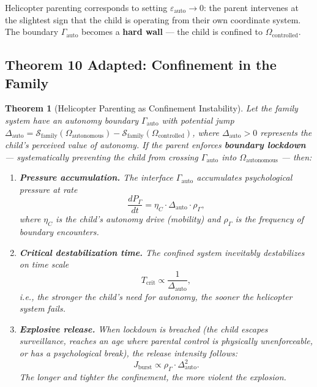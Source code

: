 \documentclass[11pt,a4paper]{article}
\newtheorem{theorem}{Theorem}[section]
\newcommand{\cS}{\mathcal{S}}
\begin{document}
Helicopter parenting corresponds to setting $\varepsilon_{\text{auto}} \to 0$: the parent intervenes at the slightest sign that the child is operating from their own coordinate system. The boundary $\Gamma_{\text{auto}}$ becomes a \textbf{hard wall} — the child is confined to $\Omega_{\text{controlled}}$.

\subsection{Theorem 10 Adapted: Confinement in the Family}

\begin{theorem}[Helicopter Parenting as Confinement Instability]
\label{thm:helicopter_confinement}
Let the family system have an autonomy boundary $\Gamma_{\text{auto}}$ with potential jump $\Delta_{\text{auto}} = \cS_{\text{family}}(\Omega_{\text{autonomous}}) - \cS_{\text{family}}(\Omega_{\text{controlled}})$, where $\Delta_{\text{auto}} > 0$ represents the child's perceived value of autonomy. If the parent enforces \textbf{boundary lockdown} — systematically preventing the child from crossing $\Gamma_{\text{auto}}$ into $\Omega_{\text{autonomous}}$ — then:

\begin{enumerate}[label=(\roman*)]
    \item \textbf{Pressure accumulation.} The interface $\Gamma_{\text{auto}}$ accumulates psychological pressure at rate
    \begin{equation}
        \frac{dP_{\Gamma}}{dt} = \eta_C \cdot \Delta_{\text{auto}} \cdot \rho_{\Gamma},
    \end{equation}
    where $\eta_C$ is the child's autonomy drive (mobility) and $\rho_{\Gamma}$ is the frequency of boundary encounters.

    \item \textbf{Critical destabilization time.} The confined system inevitably destabilizes on time scale
    \begin{equation}
        T_{\text{crit}} \propto \frac{1}{\Delta_{\text{auto}}},
    \label{eq:t_crit_helicopter}
    \end{equation}
    i.e., the stronger the child's need for autonomy, the sooner the helicopter system fails.

    \item \textbf{Explosive release.} When lockdown is breached (the child escapes surveillance, reaches an age where parental control is physically unenforceable, or has a psychological break), the release intensity follows:
    \begin{equation}
        J_{\text{burst}} \propto \rho_{\Gamma} \cdot \Delta_{\text{auto}}^2.
    \end{equation}
    The longer and tighter the confinement, the more violent the explosion.


\end{enumerate}
\end{theorem}
\end{document}
